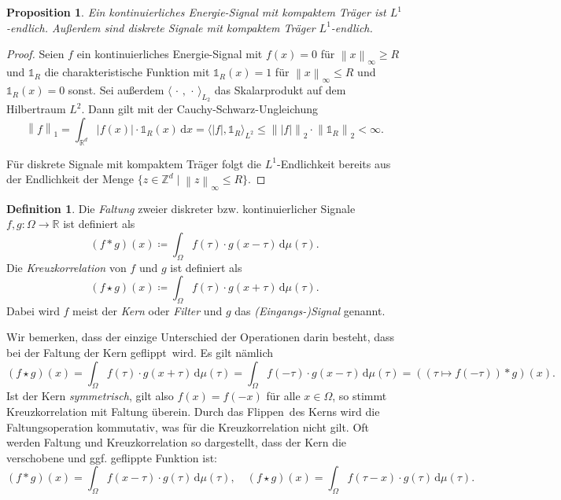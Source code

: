 \documentclass[paper=a4, 	%
		fontsize=11pt,
		abstract=true, 	%
		headsepline, 	%
		notitlepage	%
		]{scrartcl}
\newtheorem{proposition}[theorem]{Proposition}
\theoremstyle{definition}
\newtheorem{definition}[theorem]{Definition}
\newcommand{\R}{\mathbb{R}}
\newcommand{\Z}{\mathbb{Z}}
\newcommand{\diff}{\,\textrm{d}}
\newcommand{\norm}[1]{\left\lVert#1\right\rVert}
\newcommand{\abs}[1]{\left\lvert#1\right\rvert}
\begin{document}
\begin{proposition}
    Ein kontinuierliches Energie-Signal mit kompaktem Träger ist $L^1$-endlich.
    Außerdem sind diskrete Signale mit kompaktem Träger $L^1$-endlich.
\end{proposition}
\begin{proof}
    Seien $f$ ein kontinuierliches Energie-Signal mit $f(x) = 0$ für $\norm{x}_{\infty} \geq R$ und $\mathbb{1}_R$ die charakteristische Funktion mit $\mathbb{1}_R(x) = 1$ für $\norm{x}_\infty \leq R$ und $\mathbb{1}_R(x) = 0$ sonst.
    Sei außerdem $\langle \,\cdot\, , \,\cdot\, \rangle_{L_2}$ das Skalarprodukt auf dem Hilbertraum $L^2$.
    Dann gilt mit der Cauchy-Schwarz-Ungleichung
    \[
        \norm{f}_1 
        = \int_{\R^d} \abs{f(x)} \cdot \mathbb{1}_R(x) \diff x
        = \langle \abs{f}, \mathbb{1}_R \rangle_{L^2}
        \leq \norm{\abs{f}}_2 \cdot \norm{\mathbb{1}_R}_2 < \infty .
    \]

    Für diskrete Signale mit kompaktem Träger folgt die $L^1$-Endlichkeit bereits aus der Endlichkeit der Menge $\{ z\in\Z^d \mid \norm{z}_{\infty} \leq R\}$.
\end{proof}

\begin{definition}
    Die \emph{Faltung} zweier diskreter bzw. kontinuierlicher Signale $f,g: \Omega\rightarrow \R$ ist definiert als 
    \[
        (f * g)(x) \coloneqq \int_\Omega f(\tau) \cdot g(x-\tau) \diff \mu(\tau).
    \]
    Die \emph{Kreuzkorrelation} von $f$ und $g$ ist definiert als
    \[
        (f \star g)(x) \coloneqq \int_\Omega f(\tau) \cdot g(x+\tau) \diff \mu(\tau).
    \]
    Dabei wird $f$ meist der \emph{Kern} oder \emph{Filter} und $g$ das \emph{(Eingangs-)Signal} genannt.
\end{definition}

Wir bemerken, dass der einzige Unterschied der Operationen darin besteht, dass bei der Faltung der Kern \glqq geflippt\grqq\ wird.
Es gilt nämlich \[
    \left(f \star g\right)(x) = \int_{\Omega} f(\tau) \cdot g(x+\tau) \diff\mu(\tau) = \int_\Omega f(-\tau) \cdot g(x - \tau) \diff\mu(\tau) = \left((\tau\mapsto f(-\tau)) * g\right)(x).
\]
Ist der Kern \emph{symmetrisch}, gilt also $f(x) = f(-x)$ für alle $x\in\Omega$, so stimmt Kreuzkorrelation mit Faltung überein.
Durch das \glqq Flippen\grqq\ des Kerns wird die Faltungsoperation kommutativ, was für die Kreuzkorrelation nicht gilt.
Oft werden Faltung und Kreuzkorrelation so dargestellt, dass der Kern die verschobene und ggf. geflippte Funktion ist:
\[
    (f*g)(x) = \int_\Omega f(x - \tau) \cdot g(\tau)\diff\mu(\tau), \quad
    (f\star g)(x) = \int_\Omega f(\tau - x) \cdot g(\tau) \diff\mu(\tau).
\]
\end{document}
